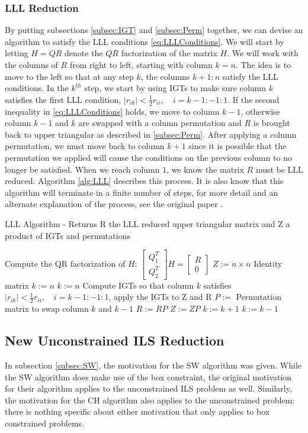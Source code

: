 \documentclass[12pt,Bold,letterpaper]{mcgilletdclass}
\newcommand{\bsmx}{\left[\begin{smallmatrix}}
\newcommand{\esmx}{\end{smallmatrix}\right]}
\newcommand{\vsp}{\vspace{\baselineskip}}
\begin{document}
\vsp \subsubsection{LLL Reduction}
By putting subsections \ref{subsec:IGT} and \ref{subsec:Perm} together, we can devise an algorithm to satisfy the LLL conditions \eqref{eq:LLLConditions}. We will start by letting $H = QR$ denote the $QR$ factorization of the matrix $H$. We will work with the columns of $R$ from right to left, starting with column $k=n$. The idea is to move to the left so that at any step $k$, the columns $k+1:n$ satisfy the LLL conditions. In the $k^{th}$ step, we start by using IGTs to make sure column $k$ satisfies the first LLL condition, $|r_{ik}| < \frac{1}{2}r_{ii}, \quad i = k-1:-1:1$. If the second inequality in \ref{eq:LLLConditions} holds, we move to column $k-1$, otherwise column $k-1$ and $k$ are swapped with a column permutation and $R$ is brought back to upper triangular as described in \ref{subsec:Perm}. After applying a column permutation, we must move back to column $k+1$ since it is possible that the permutation we applied will cause the conditions on the previous column to no longer be satisfied. When we reach column $1$, we know the matrix $R$ must be LLL reduced. Algorithm \ref{alg:LLL} describes this process. It is also know that this algorithm will terminate in a finite number of steps, for more detail and an alternate explanation of the process, see the original paper \cite{LenLL82}.

\begin{algorithm}
\caption{LLL Algorithm - Returns R the LLL reduced upper triangular matrix and Z a product of IGTs and permutations}
\label{alg:LLL}
\begin{algorithmic}[1]
\STATE Compute the QR factorization of $H$: $\bsmx Q_1^T \\ Q_2^T \esmx H= \bsmx R\\ 0 \esmx$
\STATE $Z := n \times n$ Identity matrix
\STATE $k := n$
		\STATE $k := n$	
	\ENDIF
	\STATE Compute IGTs so that column $k$ satisfies $|r_{ik}| < \frac{1}{2}r_{ii}, \quad i = k-1:-1:1$, apply the IGTs 		to Z and R
		\STATE $P := $ Permutation matrix to swap column $k$ and $k-1$
		\STATE $R := RP$
		\STATE $Z := ZP$
		\STATE $k := k+1$
	\ELSE
		\STATE $k := k-1$
	\ENDIF
\ENDWHILE
\end{algorithmic}
\end{algorithm}

\vsp \subsection{New Unconstrained ILS Reduction}
In subsection \ref{subsec:SW}, the motivation for the SW algorithm was given. While the SW algorithm does make use of the box constraint, the original motivation for their algorithm applies to the unconstrained ILS problem as well. Similarly, the motivation for the CH algorithm also applies to the unconstrained problem; there is nothing specific about either motivation that only applies to box constrained problems. 
\end{document}
